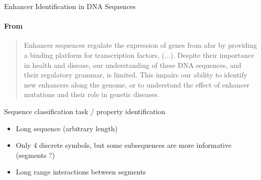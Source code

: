 %
%
\newcommand{\cga}{{\color{red!70!black} A}}
\newcommand{\cgc}{{\color{blue!70!black} C}}
\newcommand{\cgg}{{\color{yellow!70!black} G}}
\newcommand{\cgt}{{\color{green!70!black} T}}
\begin{frame}{Enhancer Identification in  DNA Sequences}
  \framesubtitle{From~\cite{Xu17Enhancer,Cohn18Enhancer}}
  \begin{quote}
    \small Enhancer sequences regulate the expression of genes from
    afar by providing a binding platform for transcription factors,
    (...). Despite
    their importance in health and disease, our understanding of these
    DNA sequences, and their regulatory grammar, is limited. This
    impairs our ability to identify new enhancers along the genome, or
    to understand the effect of enhancer mutations and their role in
    genetic diseases.
  \end{quote}
  \begin{block}{Sequence classification task / property identification}
    \begin{center}
    \end{center}
    \begin{itemize}
    \item Long sequence (arbitrary length)
    \item Only 4 discrete symbols, but  some subsequences are more informative (segments ?)
    \item Long range interactions between segments 
    \end{itemize}
  \end{block}
\end{frame}

